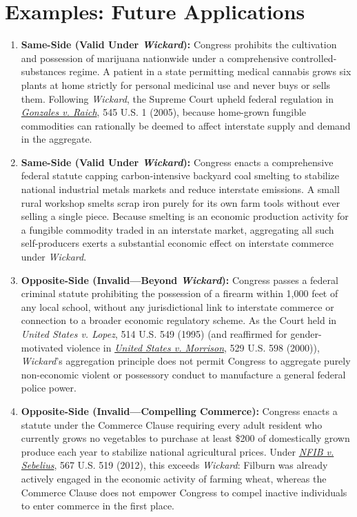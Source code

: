 \documentclass[12pt]{article}
\begin{document}
\section{Examples: Future Applications}

\begin{enumerate}
    \item \textbf{Same-Side (Valid Under \textit{Wickard}):} Congress prohibits the cultivation and possession of marijuana nationwide under a comprehensive controlled-substances regime. A patient in a state permitting medical cannabis grows six plants at home strictly for personal medicinal use and never buys or sells them. Following \textit{Wickard}, the Supreme Court upheld federal regulation in \href{https://supreme.justia.com/cases/federal/us/545/1/}{\textit{Gonzales v. Raich}}, 545 U.S. 1 (2005), because home-grown fungible commodities can rationally be deemed to affect interstate supply and demand in the aggregate.
    \item \textbf{Same-Side (Valid Under \textit{Wickard}):} Congress enacts a comprehensive federal statute capping carbon-intensive backyard coal smelting to stabilize national industrial metals markets and reduce interstate emissions. A small rural workshop smelts scrap iron purely for its own farm tools without ever selling a single piece. Because smelting is an economic production activity for a fungible commodity traded in an interstate market, aggregating all such self-producers exerts a substantial economic effect on interstate commerce under \textit{Wickard}.
    \item \textbf{Opposite-Side (Invalid---Beyond \textit{Wickard}):} Congress passes a federal criminal statute prohibiting the possession of a firearm within 1,000 feet of any local school, without any jurisdictional link to interstate commerce or connection to a broader economic regulatory scheme. As the Court held in \textit{United States v. Lopez}, 514 U.S. 549 (1995) (and reaffirmed for gender-motivated violence in \href{https://supreme.justia.com/cases/federal/us/529/598/}{\textit{United States v. Morrison}}, 529 U.S. 598 (2000)), \textit{Wickard}'s aggregation principle does not permit Congress to aggregate purely non-economic violent or possessory conduct to manufacture a general federal police power.
    \item \textbf{Opposite-Side (Invalid---Compelling Commerce):} Congress enacts a statute under the Commerce Clause requiring every adult resident who currently grows no vegetables to purchase at least \$200 of domestically grown produce each year to stabilize national agricultural prices. Under \href{https://supreme.justia.com/cases/federal/us/567/519/}{\textit{NFIB v. Sebelius}}, 567 U.S. 519 (2012), this exceeds \textit{Wickard}: Filburn was already actively engaged in the economic activity of farming wheat, whereas the Commerce Clause does not empower Congress to compel inactive individuals to enter commerce in the first place.

\end{enumerate}
\end{document}
